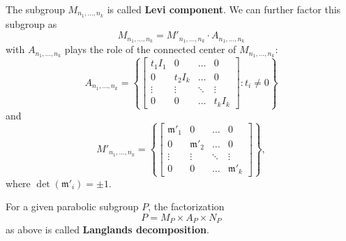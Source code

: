 The subgroup $M_{n_1,\ldots, n_k}$ is called \textbf{Levi component}. We can further factor this subgroup as
\[M_{n_1,\ldots, n_k} = M'_{n_1,\ldots, n_k} \cdot A_{n_1,\ldots, n_k}\]
with $A_{n_1,\ldots, n_k}$ plays the role of the connected center of $M_{n_1,\ldots, n_k}$:
\[A_{n_1,\ldots, n_k} = \left\lbrace \begin{bmatrix}
        t_1I_1 & 0      & \ldots & 0      \\
        0      & t_2I_k & \ldots & 0      \\
        \vdots & \vdots & \ddots & \vdots \\
        0      & 0      & \ldots & t_kI_k
    \end{bmatrix} : t_i \ne 0\right\rbrace \]
and
\[M'_{n_1,\ldots, n_k} = \left\lbrace \begin{bmatrix}
        \mathfrak{m}'_1 & 0               & \ldots & 0               \\
        0               & \mathfrak{m}'_2 & \ldots & 0               \\
        \vdots          & \vdots          & \ddots & \vdots          \\
        0               & 0               & \ldots & \mathfrak{m}'_k
    \end{bmatrix} \right\rbrace,\]
where $\det(\mathfrak{m}'_i) = \pm 1$.
\begin{definition}
    For a given parabolic subgroup $P$, the factorization
    \[P = M_P \times A_P \times N_P\]
    as above is called \textbf{Langlands decomposition}.
\end{definition}
